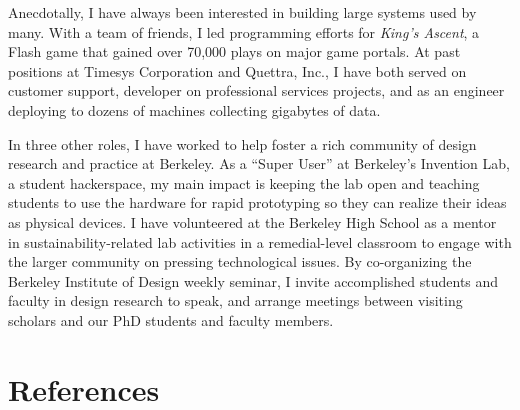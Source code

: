 \documentclass[12pt]{memoir}
\begin{document}
Anecdotally, I have always been interested in building large systems used by many.
With a team of friends, I led programming efforts for \emph{King's Ascent}, a Flash game that gained over 70,000 plays on major game portals.
At past positions at Timesys Corporation and Quettra, Inc., I have both served on customer support, developer on professional services projects, and as an engineer deploying to dozens of machines collecting gigabytes of data.

In three other roles, I have worked to help foster a rich community of design research and practice at Berkeley.
As a ``Super User'' at Berkeley's Invention Lab, a student hackerspace, my main impact is keeping the lab open and teaching students to use the hardware for rapid prototyping so they can realize their ideas as physical devices.
I have volunteered at the Berkeley High School as a mentor in sustainability-related lab activities in a remedial-level classroom to engage with the larger community on pressing technological issues.
By co-organizing the Berkeley Institute of Design weekly seminar, I invite accomplished students and faculty in design research to speak, and arrange meetings between visiting scholars and our PhD students and faculty members.

\section{References}
\printbibliography[heading=none]
\end{document}
